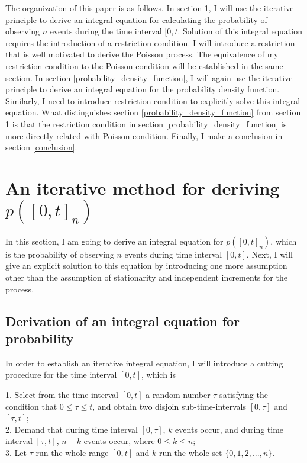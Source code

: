 \documentclass[10pt]{article}
\numberwithin{figure}{section}
\numberwithin{equation}{section}
\begin{document}
The organization of this paper is as follows. In section \ref{probability_function}, I will use the iterative principle to derive an integral equation for calculating the probability of observing $n$ events during the time interval $[0, t $. Solution of this integral equation requires the introduction of a restriction condition. I will introduce a restriction that is well motivated to derive the Poisson process. The equivalence of my restriction condition to the Poisson condition will be established in the same section. In section \ref{probability_density_function}, I will again use the iterative principle to derive an integral equation for the probability density function. Similarly, I need to introduce restriction condition to explicitly solve this integral equation. What distinguishes section \ref{probability_density_function} from section \ref{probability_function} is that the restriction condition in section \ref{probability_density_function} is more directly related with Poisson condition. Finally, I make a conclusion in section \ref{conclusion}. 

\section{An iterative method for deriving $p([0, t]_{n})$}
\label{probability_function}
In this section, I am going to derive an integral equation for $p([0, t]_{n})$, which is the probability of observing $n$ events during time interval $[0, t]$. Next, I will give an explicit solution to this equation by introducing one more assumption other than the assumption of stationarity and independent increments for the process. 

\subsection{Derivation of an integral equation for probability}
In order to establish an iterative integral equation, I will introduce a cutting procedure for the time interval $[0, t]$, which is
\begin{tcolorbox}
1. Select from the time interval $[0, t]$ a random number $\tau$ satisfying the condition that $0 \le \tau \le t$, and obtain two disjoin sub-time-intervals $[0, \tau]$ and $[\tau, t]$; \\
2. Demand that during time interval $[0, \tau]$, $k$ events occur, and during time interval $[\tau, t]$, $n - k$ events occur, where $0 \le k \le n$; \\
3. Let $\tau$ run the whole range $[0, t]$ and $k$ run the whole set $\{0, 1, 2, ..., n\}$. \\
\end{tcolorbox}
\end{document}
